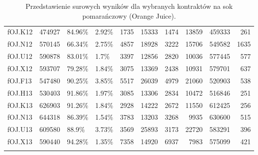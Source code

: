 \documentclass[a4paper,12pt,openany, DIV=calc, headsepline]{scrbook}
\begin{document}
{\begin{longtable}{lrllrrrrrr}
  fOJ.K12 & 474927 & 84.96\% & 2.92\% & 1735 & 15333 & 1474 & 13859 & 459333 & 261 \\ 
  fOJ.N12 & 570145 & 66.34\% & 2.75\% & 4857 & 18928 & 3222 & 15706 & 549582 & 1635 \\ 
  fOJ.U12 & 590878 & 83.01\% & 1.7\% & 3397 & 12856 & 2820 & 10036 & 577445 & 577 \\ 
  fOJ.X12 & 593707 & 79.28\% & 1.84\% & 3075 & 13369 & 2438 & 10931 & 579701 & 637 \\ 
  fOJ.F13 & 547480 & 90.25\% & 3.85\% & 5517 & 26039 & 4979 & 21060 & 520903 & 538 \\ 
  fOJ.H13 & 530403 & 91.86\% & 1.97\% & 3085 & 13306 & 2834 & 10472 & 516846 & 251 \\ 
  fOJ.K13 & 626903 & 91.26\% & 1.84\% & 2928 & 14222 & 2672 & 11550 & 612425 & 256 \\ 
  fOJ.N13 & 644318 & 86.39\% & 1.54\% & 3783 & 13203 & 3268 & 9935 & 630600 & 515 \\ 
  fOJ.U13 & 609580 & 88.9\% & 3.73\% & 3569 & 25893 & 3173 & 22720 & 583291 & 396 \\ 
  fOJ.X13 & 590440 & 94.28\% & 1.35\% & 7358 & 14920 & 6937 & 7983 & 575099 & 421 \\ 
   \hline
\hline
\caption{Przedstawienie surowych wyników dla wybranych kontraktów na sok pomarańczowy (Orange Juice).}
\label{tab:result2}
\end{longtable}}
\end{document}
